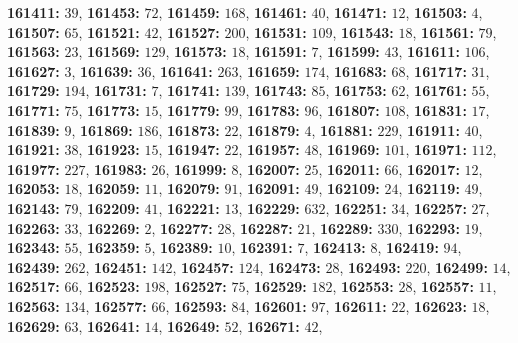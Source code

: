 \textsf{\bfseries 161411:} $39$, \textsf{\bfseries 161453:} $72$, \textsf{\bfseries 161459:} $168$, \textsf{\bfseries 161461:} $40$, \textsf{\bfseries 161471:} $12$, \textsf{\bfseries 161503:} $4$, \textsf{\bfseries 161507:} $65$, \textsf{\bfseries 161521:} $42$, \textsf{\bfseries 161527:} $200$, \textsf{\bfseries 161531:} $109$, \textsf{\bfseries 161543:} $18$, \textsf{\bfseries 161561:} $79$, \textsf{\bfseries 161563:} $23$, \textsf{\bfseries 161569:} $129$, \textsf{\bfseries 161573:} $18$, \textsf{\bfseries 161591:} $7$, \textsf{\bfseries 161599:} $43$, \textsf{\bfseries 161611:} $106$, \textsf{\bfseries 161627:} $3$, \textsf{\bfseries 161639:} $36$, \textsf{\bfseries 161641:} $263$, \textsf{\bfseries 161659:} $174$, \textsf{\bfseries 161683:} $68$, \textsf{\bfseries 161717:} $31$, \textsf{\bfseries 161729:} $194$, \textsf{\bfseries 161731:} $7$, \textsf{\bfseries 161741:} $139$, \textsf{\bfseries 161743:} $85$, \textsf{\bfseries 161753:} $62$, \textsf{\bfseries 161761:} $55$, \textsf{\bfseries 161771:} $75$, \textsf{\bfseries 161773:} $15$, \textsf{\bfseries 161779:} $99$, \textsf{\bfseries 161783:} $96$, \textsf{\bfseries 161807:} $108$, \textsf{\bfseries 161831:} $17$, \textsf{\bfseries 161839:} $9$, \textsf{\bfseries 161869:} $186$, \textsf{\bfseries 161873:} $22$, \textsf{\bfseries 161879:} $4$, \textsf{\bfseries 161881:} $229$, \textsf{\bfseries 161911:} $40$, \textsf{\bfseries 161921:} $38$, \textsf{\bfseries 161923:} $15$, \textsf{\bfseries 161947:} $22$, \textsf{\bfseries 161957:} $48$, \textsf{\bfseries 161969:} $101$, \textsf{\bfseries 161971:} $112$, \textsf{\bfseries 161977:} $227$, \textsf{\bfseries 161983:} $26$, \textsf{\bfseries 161999:} $8$, \textsf{\bfseries 162007:} $25$, \textsf{\bfseries 162011:} $66$, \textsf{\bfseries 162017:} $12$, \textsf{\bfseries 162053:} $18$, \textsf{\bfseries 162059:} $11$, \textsf{\bfseries 162079:} $91$, \textsf{\bfseries 162091:} $49$, \textsf{\bfseries 162109:} $24$, \textsf{\bfseries 162119:} $49$, \textsf{\bfseries 162143:} $79$, \textsf{\bfseries 162209:} $41$, \textsf{\bfseries 162221:} $13$, \textsf{\bfseries 162229:} $632$, \textsf{\bfseries 162251:} $34$, \textsf{\bfseries 162257:} $27$, \textsf{\bfseries 162263:} $33$, \textsf{\bfseries 162269:} $2$, \textsf{\bfseries 162277:} $28$, \textsf{\bfseries 162287:} $21$, \textsf{\bfseries 162289:} $330$, \textsf{\bfseries 162293:} $19$, \textsf{\bfseries 162343:} $55$, \textsf{\bfseries 162359:} $5$, \textsf{\bfseries 162389:} $10$, \textsf{\bfseries 162391:} $7$, \textsf{\bfseries 162413:} $8$, \textsf{\bfseries 162419:} $94$, \textsf{\bfseries 162439:} $262$, \textsf{\bfseries 162451:} $142$, \textsf{\bfseries 162457:} $124$, \textsf{\bfseries 162473:} $28$, \textsf{\bfseries 162493:} $220$, \textsf{\bfseries 162499:} $14$, \textsf{\bfseries 162517:} $66$, \textsf{\bfseries 162523:} $198$, \textsf{\bfseries 162527:} $75$, \textsf{\bfseries 162529:} $182$, \textsf{\bfseries 162553:} $28$, \textsf{\bfseries 162557:} $11$, \textsf{\bfseries 162563:} $134$, \textsf{\bfseries 162577:} $66$, \textsf{\bfseries 162593:} $84$, \textsf{\bfseries 162601:} $97$, \textsf{\bfseries 162611:} $22$, \textsf{\bfseries 162623:} $18$, \textsf{\bfseries 162629:} $63$, \textsf{\bfseries 162641:} $14$, \textsf{\bfseries 162649:} $52$, \textsf{\bfseries 162671:} $42$, 
